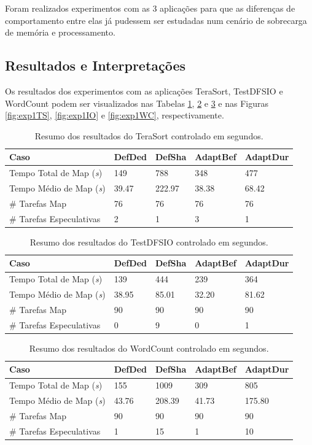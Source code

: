 Foram realizados experimentos com as 3 aplicações para que as diferenças de comportamento entre elas já pudessem ser estudadas num cenário de sobrecarga de memória e processamento.

\subsection{Resultados e Interpretações}
Os resultados dos experimentos com as aplicações TeraSort, TestDFSIO e WordCount podem ser visualizados nas Tabelas \ref{tab:exp1TS}, \ref{tab:exp1IO} e \ref{tab:exp1WC} e nas Figuras \ref{fig:exp1TS}, \ref{fig:exp1IO} e \ref{fig:exp1WC}, respectivamente.

\begin{table}[!ht]
	\caption{Resumo dos resultados do TeraSort controlado em segundos.} \label{tab:exp1TS}
	\begin{tabular*}{\hsize}{lllll}
		\textbf{Caso} & \textbf{DefDed} & \textbf{DefSha} & \textbf{AdaptBef} & \textbf{AdaptDur}\\
		\hline
		Tempo Total de Map ({\it{s}}) & 149 & 788 & 348 & 477 \\
		Tempo Médio de Map ({\it{s}}) & 39.47 & 222.97 & 38.38 & 68.42 \\
		\# Tarefas Map & 76 & 76 & 76 & 76 \\
		\# Tarefas Especulativas & 2 & 1 & 3 & 1 \\
	\end{tabular*}
\end{table}

\begin{table}[!ht]
	\caption{Resumo dos resultados do TestDFSIO controlado em segundos.} \label{tab:exp1IO}
	\begin{tabular*}{\hsize}{lllll}
		\textbf{Caso} & \textbf{DefDed} & \textbf{DefSha} & \textbf{AdaptBef} & \textbf{AdaptDur}\\
		\hline
		Tempo Total de Map ({\it{s}}) & 139 & 444 & 239 & 364 \\
		Tempo Médio de Map ({\it{s}}) & 38.95 & 85.01 & 32.20 & 81.62 \\
		\# Tarefas Map & 90 & 90 & 90 & 90 \\
		\# Tarefas Especulativas & 0 & 9 & 0 & 1 \\
	\end{tabular*}
\end{table}


\begin{table}[!ht]
	\caption{Resumo dos resultados do WordCount controlado em segundos.} \label{tab:exp1WC}
	\begin{tabular*}{\hsize}{lllll}
		\textbf{Caso} & \textbf{DefDed} & \textbf{DefSha} & \textbf{AdaptBef} & \textbf{AdaptDur}\\
		\hline
		Tempo Total de Map ({\it{s}}) & 155 & 1009 & 309 & 805 \\
		Tempo Médio de Map ({\it{s}}) & 43.76 & 208.39 & 41.73 & 175.80 \\
		\# Tarefas Map & 90 & 90 & 90 & 90 \\
		\# Tarefas Especulativas & 1 & 15 & 1 & 10 \\
	\end{tabular*}
\end{table}

